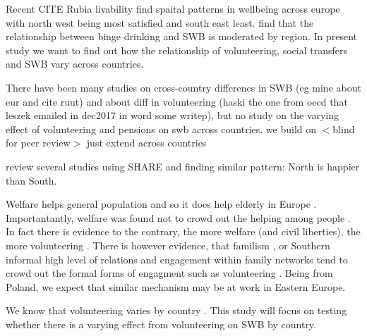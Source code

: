 \documentclass[10pt, letterpaper]{article}
\newcommand{\emd}[1]{\ExecuteMetaData[/tmp/tex]{#1}} %
\begin{document}
\begin{spacing}{1.4} %






Recent CITE Rubia livability find spaital patterns in wellbeing across europe with
north west being most satisfied and south east least. \citet{fuentes17} find
that the relationship between binge drinking and SWB is moderated by region. In
present study we want to find out how the relationship of volunteering, social
transfers and SWB vary across countries. 

There have been many studies on cross-country differencs in SWB (eg mine about
eur and cite ruut) and about diff in volunteering (haski the one from oecd that
leszek emailed in dec2017 in word some writep), but no study on the varying
effect of volunteering and pensions on swb across countries. 
we build on $<$blind for peer review$>$  %
just extend across countries
 



\citet{duda16} %
review several studies using SHARE and finding similar
pattern: North is happier than South.

Welfare helps general population
\citep{radcliff01,pacek08b,pacek08r,radcliff13,aokJap14} and so it does help elderly
in Europe \citep{motel09,niedzwiedz14}. Importantantly, welfare was found not to
crowd out the helping among people \citep{motel05}. In fact there is evidence to
the contrary, the more welfare (and civil liberties), the more volunteering
\citep{hank10}.
%
There is however evidence, that familism \citep{banfield67}, or Southern
informal high level of relations and engagement within family networks tend to
crowd out the formal forms of engagment such as volunteering
\citep{kohli09,pichler07}. Being from Poland, we expect that similar mechanism may be at work in Eastern Europe.



We know that volunteering varies by country \citep[e.g.,][]{hank09}. This study
will focus on testing whether there is a varying effect from volunteering on SWB
by country. 


\end{spacing}
\end{document}

